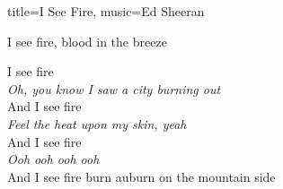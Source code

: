 \begin{song}{title={I See Fire}, music={Ed Sheeran}}
\begin{multicols}{2}
\begin{chorus}
        I see fire, blood in the breeze
    \end{chorus}
    \begin{chorus*}
        I see fire \\
        \textit{Oh, you know I saw a city burning out} \smallskip \\
        And I see fire \\
        \textit{Feel the heat upon my skin, yeah} \smallskip \\
        And I see fire \\
        \textit{Ooh ooh ooh ooh} \smallskip \\
        And I see fire burn auburn on the mountain side
    \end{chorus*}
\end{multicols}
\end{song}

